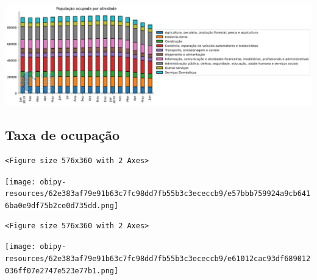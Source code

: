 \documentclass[11pt]{article}
\begin{document}
\begin{center}
\includegraphics[width=.9\linewidth]{obipy-resources/62e383af79e91b63c7fc98dd7fb55b3c3ececcb9/18ae86fa0395bd8722bf758ae72aaa47ff7d9d15.png}
\end{center}



\subsection{Taxa de ocupação}
\label{sec:org278f013}

\begin{verbatim}
<Figure size 576x360 with 2 Axes>
\end{verbatim}


\begin{center}
\texttt{[image: obipy-resources/62e383af79e91b63c7fc98dd7fb55b3c3ececcb9/e57bbb759924a9cb6416ba0e9df75b2ce0d735dd.png]}
\end{center}


\begin{verbatim}
<Figure size 576x360 with 2 Axes>
\end{verbatim}


\begin{center}
\texttt{[image: obipy-resources/62e383af79e91b63c7fc98dd7fb55b3c3ececcb9/e61012cac93df689012036ff07e2747e523e77b1.png]}
\end{center}
\end{document}
